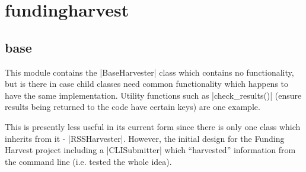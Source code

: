 % 
% 

\section{fundingharvest}
\label{design-main-last}

\subsection{base}
\label{design-fundingharvest-base}
This module contains the |BaseHarvester| class which contains no functionality, but is there in case child classes need common functionality which happens to have the same implementation. Utility functions such as |check_results()| (ensure results being returned to the code have certain keys) are one example.

This is presently less useful in its current form since there is only one class which inherits from it - |RSSHarvester|. However, the initial design for the Funding Harvest project including a |CLISubmitter| which ``harvested'' information from the command line (i.e. tested the whole idea).

